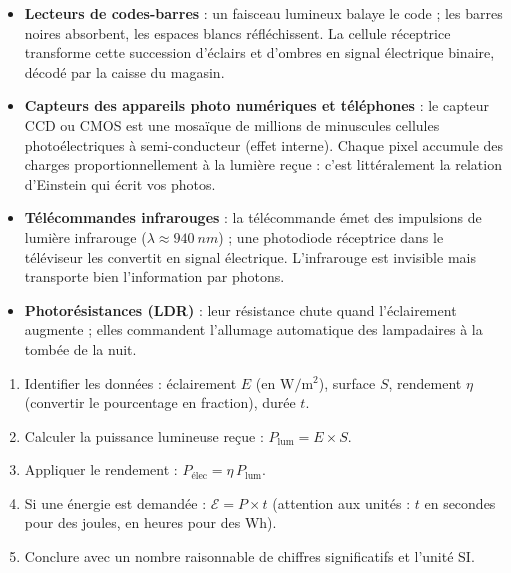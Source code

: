 \documentclass[11pt]{article}
\begin{document}
\begin{itemize}
\item \textbf{Lecteurs de codes-barres} : un faisceau lumineux balaye le code ; les barres noires absorbent, les espaces blancs réfléchissent. La cellule réceptrice transforme cette succession d'éclairs et d'ombres en signal électrique binaire, décodé par la caisse du magasin.
\item \textbf{Capteurs des appareils photo numériques et téléphones} : le capteur CCD ou CMOS est une mosaïque de millions de minuscules cellules photoélectriques à semi-conducteur (effet interne). Chaque pixel accumule des charges proportionnellement à la lumière reçue : c'est littéralement la relation d'Einstein qui écrit vos photos.
\item \textbf{Télécommandes infrarouges} : la télécommande émet des impulsions de lumière infrarouge ($\lambda \approx \SI{940}{nm}$) ; une photodiode réceptrice dans le téléviseur les convertit en signal électrique. L'infrarouge est invisible mais transporte bien l'information par photons.
\item \textbf{Photorésistances (LDR)} : leur résistance chute quand l'éclairement augmente ; elles commandent l'allumage automatique des lampadaires à la tombée de la nuit.
\end{itemize}

\begin{methode}
\begin{enumerate}
\item Identifier les données : éclairement $E$ (en $\mathrm{W/m^2}$), surface $S$, rendement $\eta$ (convertir le pourcentage en fraction), durée $t$.
\item Calculer la puissance lumineuse reçue : $P_{\text{lum}} = E \times S$.
\item Appliquer le rendement : $P_{\text{élec}} = \eta \, P_{\text{lum}}$.
\item Si une énergie est demandée : $\mathcal{E} = P \times t$ (attention aux unités : $t$ en secondes pour des joules, en heures pour des Wh).
\item Conclure avec un nombre raisonnable de chiffres significatifs et l'unité SI.
\end{enumerate}
\end{methode}
\end{document}
